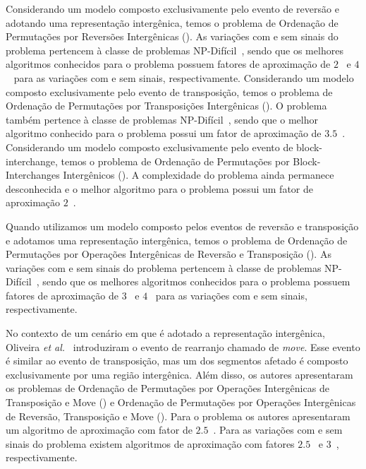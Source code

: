 Considerando um modelo composto exclusivamente pelo evento de reversão e adotando uma representação intergênica, temos o problema de Ordenação de Permutações por Reversões Intergênicas (\SbIR). As variações com e sem sinais do problema pertencem à classe de problemas NP-Difícil~\cite{2021b-oliveira-etal,2020a-brito-etal}, sendo que os melhores algoritmos conhecidos para o problema possuem fatores de aproximação de $2$~\cite{2021b-oliveira-etal} e $4$~\cite{2020a-brito-etal} para as variações com e sem sinais, respectivamente. Considerando um modelo composto exclusivamente pelo evento de transposição, temos o problema de Ordenação de Permutações por Transposições Intergênicas (\SbIT). O problema também pertence à classe de problemas NP-Difícil~\cite{2021a-oliveira-etal}, sendo que o melhor algoritmo conhecido para o problema possui um fator de aproximação de $3.5$~\cite{2021a-oliveira-etal}. Considerando um modelo composto exclusivamente pelo evento de block-interchange, temos o problema de Ordenação de Permutações por Block-Interchanges Intergênicos (\SbIBI). A complexidade do problema ainda permanece desconhecida e o melhor algoritmo para o problema possui um fator de aproximação $2$~\cite{2019-dias-etal}.

Quando utilizamos um modelo composto pelos eventos de reversão e transposição e adotamos uma representação intergênica, temos o problema de Ordenação de Permutações por Operações Intergênicas de Reversão e Transposição (\SbIRT). As variações com e sem sinais do problema pertencem à classe de problemas NP-Difícil~\cite{2021a-oliveira-etal,2020a-brito-etal}, sendo que os melhores algoritmos conhecidos para o problema possuem fatores de aproximação de $3$~\cite{2021a-oliveira-etal} e $4$~\cite{2021b-brito-etal} para as variações com e sem sinais, respectivamente.

No contexto de um cenário em que é adotado a representação intergênica, Oliveira \textit{et al.}~\cite{2021a-oliveira-etal} introduziram o evento de rearranjo chamado de \emph{move}. Esse evento é similar ao evento de transposição, mas um dos segmentos afetado é composto exclusivamente por uma região intergênica. Além disso, os autores apresentaram os problemas de Ordenação de Permutações por Operações Intergênicas de Transposição e Move (\SbITM) e Ordenação de Permutações por Operações Intergênicas de Reversão, Transposição e Move (\SbIRTM). Para o problema \SbITM{} os autores apresentaram um algoritmo de aproximação com fator de $2.5$~\cite{2021a-oliveira-etal}. Para as variações com e sem sinais do problema \SbIRTM{} existem algoritmos de aproximação com fatores $2.5$~\cite{2021a-oliveira-etal} e $3$~\cite{2021b-brito-etal}, respectivamente.  


